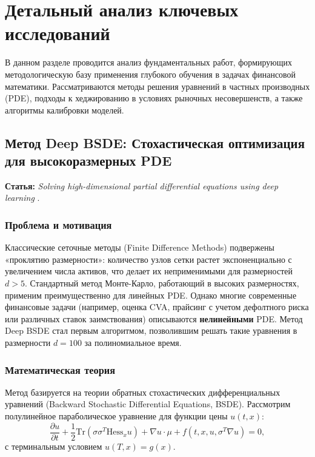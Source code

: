 \section{Детальный анализ ключевых исследований}

В данном разделе проводится анализ фундаментальных работ, формирующих методологическую базу применения глубокого обучения в задачах финансовой математики. Рассматриваются методы решения уравнений в частных производных (PDE), подходы к хеджированию в условиях рыночных несовершенств, а также алгоритмы калибровки моделей.

\subsection{Метод Deep BSDE: Стохастическая оптимизация для высокоразмерных PDE}
\textbf{Статья:} \textit{Solving high-dimensional partial differential equations using deep learning} \cite{Han2018}.

\subsubsection{Проблема и мотивация}
Классические сеточные методы (Finite Difference Methods) подвержены «проклятию размерности»: количество узлов сетки растет экспоненциально с увеличением числа активов, что делает их неприменимыми для размерностей $d > 5$. Стандартный метод Монте-Карло, работающий в высоких размерностях, применим преимущественно для линейных PDE.
Однако многие современные финансовые задачи (например, оценка CVA, прайсинг с учетом дефолтного риска или различных ставок заимствования) описываются \textbf{нелинейными} PDE. Метод Deep BSDE стал первым алгоритмом, позволившим решать такие уравнения в размерности $d=100$ за полиномиальное время.

\subsubsection{Математическая теория}
Метод базируется на теории обратных стохастических дифференциальных уравнений (Backward Stochastic Differential Equations, BSDE). Рассмотрим полулинейное параболическое уравнение для функции цены $u(t, x)$:
\begin{equation}
    \frac{\partial u}{\partial t} + \frac{1}{2}\text{Tr}(\sigma\sigma^T \text{Hess}_x u) + \nabla u \cdot \mu + f(t, x, u, \sigma^T \nabla u) = 0,
\end{equation}
с терминальным условием $u(T, x) = g(x)$.

